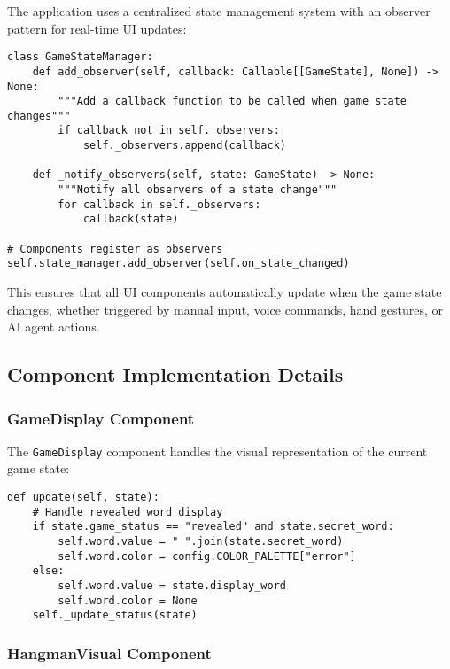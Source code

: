 The application uses a centralized state management system with an observer pattern for real-time UI updates:

\begin{lstlisting}[style=pystyle, caption={Observer Pattern Implementation}]
class GameStateManager:
    def add_observer(self, callback: Callable[[GameState], None]) -> None:
        """Add a callback function to be called when game state changes"""
        if callback not in self._observers:
            self._observers.append(callback)
    
    def _notify_observers(self, state: GameState) -> None:
        """Notify all observers of a state change"""
        for callback in self._observers:
            callback(state)

# Components register as observers
self.state_manager.add_observer(self.on_state_changed)
\end{lstlisting}

This ensures that all UI components automatically update when the game state changes, whether triggered by manual input, voice commands, hand gestures, or AI agent actions.

\subsection*{Component Implementation Details}

\subsubsection*{GameDisplay Component}

The \texttt{GameDisplay} component handles the visual representation of the current game state:

\begin{lstlisting}[style=pystyle, caption={GameDisplay Update Logic}]
def update(self, state):
    # Handle revealed word display
    if state.game_status == "revealed" and state.secret_word:
        self.word.value = " ".join(state.secret_word)
        self.word.color = config.COLOR_PALETTE["error"]
    else:
        self.word.value = state.display_word
        self.word.color = None
    self._update_status(state)
\end{lstlisting}

\subsubsection*{HangmanVisual Component}

